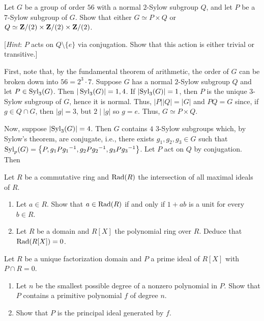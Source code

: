 \begin{problem}
  Let $G$ be a group of order $56$ with a normal $2$-Sylow subgroup $Q$,
  and let $P$ be a $7$-Sylow subgroup of $G$. Show that either $G\simeq
  P\times Q$ or $Q\simeq\mathbf{Z}/(2)\times\mathbf{Z}/(2)\times\mathbf{Z}/(2)$.

  [\emph{Hint}: $P$ acts on $Q\setminus\{e\}$ via conjugation. Show
  that this action is either trivial or transitive.]
\end{problem}
\begin{solution}
  First, note that, by the fundamental theorem of arithmetic, the order of
  $G$ can be broken down into $56=2^3 \cdot 7$. Suppose $G$ has a normal
  $2$-Sylow subgroup $Q$ and let $P\in\operatorname{Syl}_3(G)$. Then
  $|\operatorname{Syl}_3(G)|=1,4$. If $|{\operatorname{Syl}_3(G)}|=1$, then $P$ is the unique $3$-Sylow
  subgroup of $G$, hence it is normal. Thus, $|P||Q|=|G|$ and $PQ=G$ since,
  if $g\in Q\cap G$, then $|g|=3$, but $2\mid |g|$ so $g=e$. Thus, $G\simeq
  P\times Q$.

  Now, suppose $|{\operatorname{Syl}_3(G)}|=4$. Then $G$ contains $4$ $3$-Sylow subgroups
  which, by Sylow's theorem, are conjugate, i.e., there exists
  $g_1,g_2,g_3\in G$ such that
  $\operatorname{Syl}_p(G)=\left\{P,g_1P{g_1}^{-1},g_2P{g_2}^{-1},g_3P{g_3}^{-1}\right\}$. Let
  $P$ act on $Q$ by conjugation. Then
\end{solution}

\begin{problem}
  Let $R$ be a commutative ring and $\operatorname{Rad}(R)$ the intersection of all
  maximal ideals of $R$.
  \begin{enumerate}[label=(\alph*),noitemsep]
  \item Let $a\in R$. Show that $a\in\operatorname{Rad}(R)$ if and only if $1+ab$ is a
    unit for every $b\in R$.
  \item Let $R$ be a domain and $R[X]$ the polynomial ring over
    $R$. Deduce that $\operatorname{Rad}(R[X])=0$.
  \end{enumerate}
\end{problem}
\begin{solution}
\end{solution}

\begin{problem}
  Let $R$ be a unique factorization domain and $P$ a prime ideal of $R[X]$
  with $P\cap R=0$.
  \begin{enumerate}[label=(\alph*),noitemsep]
  \item Let $n$ be the smallest possible degree of a nonzero polynomial in
    $P$. Show that $P$ contains a primitive polynomial $f$ of degree $n$.
  \item Show that $P$ is the principal ideal generated by $f$.
  \end{enumerate}
\end{problem}
\begin{solution}
\end{solution}

